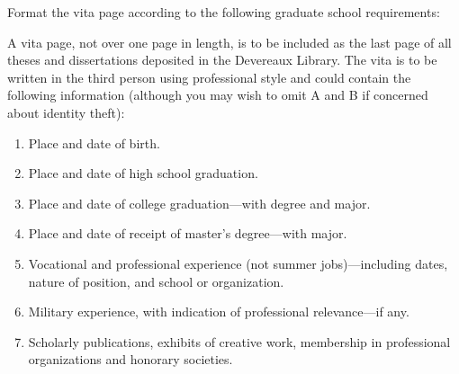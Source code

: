 \documentclass[12pt]{thesis}
\begin{document}


\begin{vita}

  
  Format the vita page according to the following graduate school requirements:

A vita page, not over one page in length, is to be included as the
last page of all theses and dissertations deposited in the Devereaux
Library. The vita is to be written in the third person using
professional style and could contain the following information
(although you may wish to omit A and B if concerned about identity
theft):
\begin{enumerate}[label=\Alph*.]
\item Place and date of birth.

\item Place and date of high school graduation.

\item Place and date of college graduation—with degree and major.

\item Place and date of receipt of master’s degree—with major.

\item Vocational and professional experience (not summer jobs)—including dates, nature of position, and school or organization.

\item Military experience, with indication of professional relevance—if any.

\item Scholarly publications, exhibits of creative work, membership in professional organizations and honorary societies.
\end{enumerate}
  

\end{vita}
\end{document}
